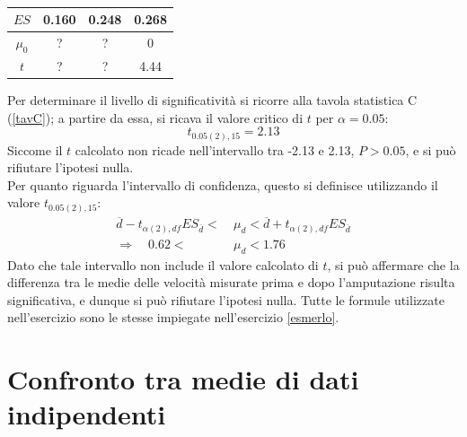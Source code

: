 \documentclass[10pt, draft]{book}
\newcounter{example}[section]
\begin{document}
\begin{example}
\begin{table}[H]
\begin{tabular}{c|c|c||c}
        \hline
        \textbf{$ES$} & 0.160 & 0.248 & 0.268\\
        \hline
        \textbf{$\mu_0$} & ? & ? & 0\\
        \hline
        \textbf{$t$} & ? & ? & 4.44\\
        \hline
        \end{tabular}
        \caption{\small{}}
        \label{tabamputazione2}
    \end{table}\noindent
    Per determinare il livello di significatività si ricorre alla tavola statistica C (\ref{tavC}); a partire da essa, si ricava il valore critico di $t$ per $\alpha = 0.05$:
    \begin{equation}
        t_{0.05(2),15} = 2.13
    \end{equation}
    Siccome il $t$ calcolato non ricade nell'intervallo tra -2.13 e 2.13, $P>0.05$, e si può rifiutare l'ipotesi nulla.
    \\
    Per quanto riguarda l'intervallo di confidenza, questo si definisce utilizzando il valore $t_{0.05(2),15}$:
    \begin{align*}
        \overline{d}-t_{\alpha(2),df}ES_{\overline{d}}<\ &\mu_d<\overline{d}+t_{\alpha(2),df}ES_{\overline{d}}
        \\
        \Rightarrow \quad 0.62<\ &\mu_d<1.76
    \end{align*}
    Dato che tale intervallo non include il valore calcolato di $t$, si può affermare che la differenza tra le medie delle velocità misurate prima e dopo l'amputazione risulta significativa, e dunque si può rifiutare l'ipotesi nulla.
    Tutte le formule utilizzate nell'esercizio sono le stesse impiegate nell'esercizio \ref{esmerlo}.
\end{example}

\section{Confronto tra medie di dati indipendenti}
\end{document}
